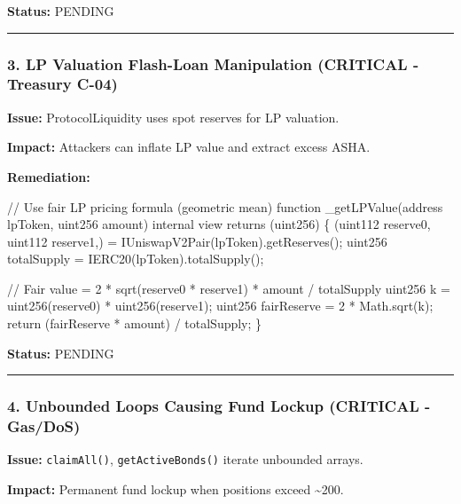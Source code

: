 \documentclass[
]{article}
\newenvironment{Shaded}{}{}
\newcommand{\NormalTok}[1]{#1}
\begin{document}
\textbf{Status:} PENDING

\begin{center}\rule{0.5\linewidth}{0.5pt}\end{center}

\subsubsection{3. LP Valuation Flash-Loan Manipulation (CRITICAL -
Treasury
C-04)}\label{3-lp-valuation-flash-loan-manipulation-critical---treasury-c-04}

\textbf{Issue:} ProtocolLiquidity uses spot reserves for LP valuation.

\textbf{Impact:} Attackers can inflate LP value and extract excess ASHA.

\textbf{Remediation:}

\begin{Shaded}
\begin{Highlighting}[]
\NormalTok{// Use fair LP pricing formula (geometric mean)}
\NormalTok{function \_getLPValue(address lpToken, uint256 amount) internal view returns (uint256) \{}
\NormalTok{    (uint112 reserve0, uint112 reserve1,) = IUniswapV2Pair(lpToken).getReserves();}
\NormalTok{    uint256 totalSupply = IERC20(lpToken).totalSupply();}

\NormalTok{    // Fair value = 2 * sqrt(reserve0 * reserve1) * amount / totalSupply}
\NormalTok{    uint256 k = uint256(reserve0) * uint256(reserve1);}
\NormalTok{    uint256 fairReserve = 2 * Math.sqrt(k);}
\NormalTok{    return (fairReserve * amount) / totalSupply;}
\NormalTok{\}}
\end{Highlighting}
\end{Shaded}

\textbf{Status:} PENDING

\begin{center}\rule{0.5\linewidth}{0.5pt}\end{center}

\subsubsection{4. Unbounded Loops Causing Fund Lockup (CRITICAL -
Gas/DoS)}\label{4-unbounded-loops-causing-fund-lockup-critical---gasdos}

\textbf{Issue:} \texttt{claimAll()}, \texttt{getActiveBonds()} iterate
unbounded arrays.

\textbf{Impact:} Permanent fund lockup when positions exceed
\textasciitilde200.
\end{document}
